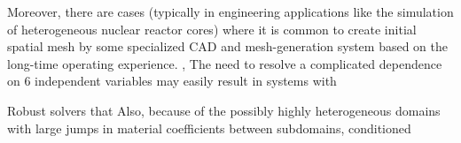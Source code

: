 Moreover, there are cases (typically
in engineering applications like the simulation of heterogeneous nuclear reactor cores) where it is common to create
initial spatial mesh by some specialized CAD and mesh-generation system based on the long-time operating experience. ,
The need to resolve a complicated dependence on 6 independent variables may easily result in systems with

Robust solvers that Also, because of the possibly highly heterogeneous domains with large jumps in material coefficients
between subdomains, conditioned
